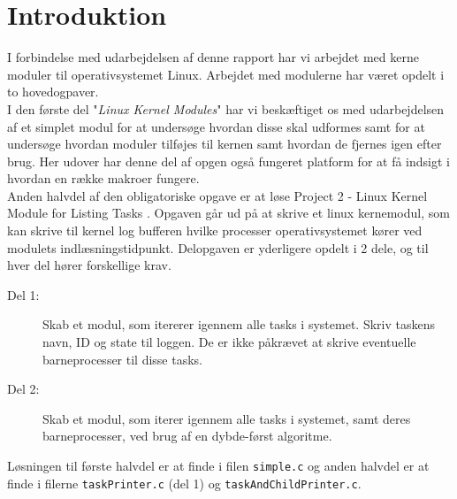 \documentclass[main.tex]{subfile}
\begin{document}
\section{Introduktion}
I forbindelse med udarbejdelsen af denne rapport har vi arbejdet med kerne moduler til operativsystemet Linux. Arbejdet med modulerne har været opdelt i to hovedogpaver.\\ 

I den første del "\emph{Linux Kernel Modules}" \cite[s.94]{SA:2013} har vi beskæftiget os med udarbejdelsen af et simplet modul for at undersøge hvordan disse skal udformes samt for at undersøge hvordan moduler tilføjes til kernen samt hvordan de fjernes igen efter brug. Her udover har denne del af opgen også fungeret platform for at få indsigt i hvordan en række makroer fungere.\\

Anden halvdel af den obligatoriske opgave er at løse Project 2 - Linux Kernel Module for Listing Tasks \cite[s.156-158]{SA:2013}. Opgaven går ud på at skrive et linux kernemodul, som kan skrive til kernel log bufferen hvilke processer operativsystemet kører ved modulets indlæsningstidpunkt. Delopgaven er yderligere opdelt i 2 dele, og til hver del hører forskellige krav.

\begin{description}
\item[Del 1:] Skab et modul, som itererer igennem alle tasks i systemet. Skriv taskens navn, ID og state til loggen. De er ikke påkrævet at skrive eventuelle barneprocesser til disse tasks.
\item[Del 2:] Skab et modul, som iterer igennem alle tasks i systemet, samt deres barneprocesser, ved brug af en dybde-først algoritme.
\end{description}

Løsningen til første halvdel er at finde i filen \texttt{simple.c} og anden halvdel er at finde i filerne \texttt{taskPrinter.c} (del 1) og \texttt{taskAndChildPrinter.c}.
\end{document}
